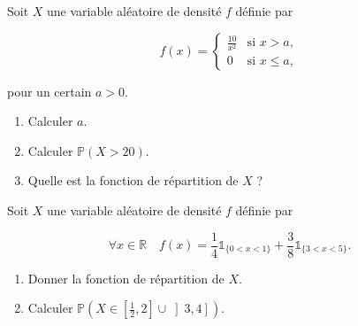 \medskip

\begin{mdframed}
\begin{exercice}
Soit $X$ une variable aléatoire de densité $f$ définie par

$$
f(x) = \begin{cases} 
\frac{10}{x^2} & \text{si } x > a, \\ 
0 & \text{si } x \leqslant a, 
\end{cases}
$$

pour un certain $a > 0$.

\begin{enumerate}
\item Calculer $a$.
\item Calculer $\mathbb{P}(X > 20)$.
\item Quelle est la fonction de répartition de $X$ ?
\end{enumerate}
\end{exercice}
\end{mdframed}

\medskip

\begin{mdframed}
\begin{exercice}
Soit $X$ une variable aléatoire de densité $f$ définie par

$$
\forall x \in \mathbb{R} \quad f(x) = \frac{1}{4} \mathbb{1}_{\{0 < x < 1\}} + \frac{3}{8} \mathbb{1}_{\{3 < x < 5\}}.
$$

\begin{enumerate}
\item Donner la fonction de répartition de $X$.
\item Calculer $\mathbb{P}\left(X \in \left[\frac{1}{2}, 2\right] \cup \left]3, 4\right]\right)$.
\end{enumerate}
\end{exercice}
\end{mdframed}